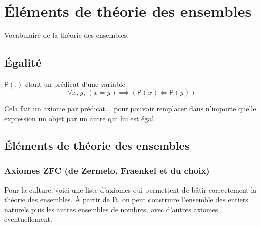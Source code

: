 
\section{Éléments de théorie des ensembles}
Vocabulaire de la théorie des ensembles.
\subsection{Égalité}
\begin{axiom}
 \(𝖯(.)\) étant un prédicat d'une variable
\begin{equation*}
∀𝑥,𝑦\text{, }(𝑥=𝑦)⟹(𝖯(𝑥)⇔𝖯(𝑦))
\end{equation*}\end{axiom}
\begin{remark}
Cela fait un axiome par prédicat... pour pouvoir remplacer dans
n'importe quelle expression un objet par un autre qui lui est égal.
\end{remark}
%
\subsection{Éléments de théorie des ensembles}
\subsubsection{Axiomes ZFC (de Zermelo, Fraenkel et du choix)}
Pour la culture, voici une liste d'axiomes qui permettent de bâtir correctement la théorie des ensembles. À partir de
là, on peut construire l'ensemble des entiers naturels puis les autres ensembles de nombres, avec d'autres axiomes
éventuellement.

